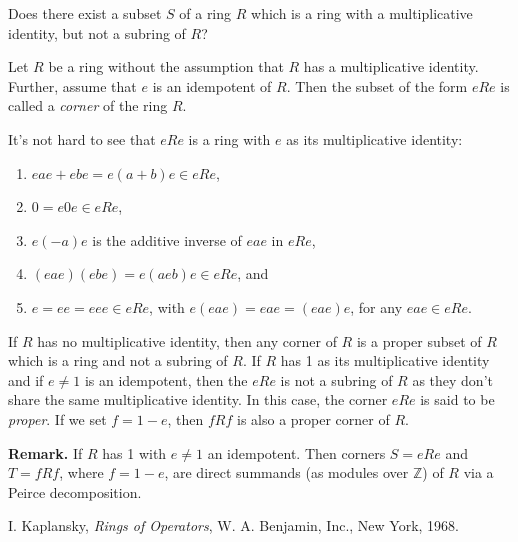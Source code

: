 \documentclass[12pt]{article}
\begin{document}
Does there exist a subset $S$ of a ring $R$ which is a ring with a multiplicative identity, but not a subring of $R$?

Let $R$ be a ring without the assumption that $R$ has a multiplicative identity.  Further, assume that $e$ is an idempotent of $R$.  Then the subset of the form $eRe$ is called a \emph{corner} of the ring $R$.

It's not hard to see that $eRe$ is a ring with $e$ as its multiplicative identity:
\begin{enumerate}
\item $eae+ebe=e(a+b)e\in eRe$,
\item $0=e0e\in eRe$,
\item $e(-a)e$ is the additive inverse of $eae$ in $eRe$,
\item $(eae)(ebe)=e(aeb)e\in eRe$, and 
\item $e=ee=eee\in eRe$, with $e(eae)=eae=(eae)e$, for any $eae\in eRe$.
\end{enumerate}

If $R$ has no multiplicative identity, then any corner of $R$ is a proper subset of $R$ which is a ring and not a subring of $R$.  If $R$ has 1 as its multiplicative identity and if $e\neq 1$ is an idempotent, then the $eRe$ is not a subring of $R$ as they don't share the same multiplicative identity.  In this case, the corner $eRe$ is said to be \emph{proper}.  If we set $f=1-e$, then $fRf$ is also a proper corner of $R$.

\textbf{Remark.}  If $R$ has 1 with $e\neq 1$ an idempotent.  Then corners $S=eRe$ and $T=fRf$, where $f=1-e$, are direct summands (as modules over $\mathbb{Z}$) of $R$ via a Peirce decomposition.

\begin{thebibliography}{9}
 I. Kaplansky, \emph{Rings of Operators}, W. A. Benjamin, Inc., New York, 1968.
\end{thebibliography}
\end{document}
